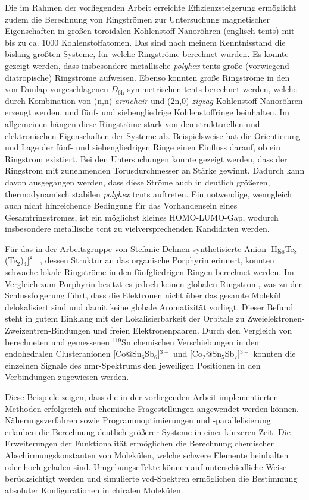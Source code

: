 \bigskip
Die im Rahmen der vorliegenden Arbeit erreichte Effizienzsteigerung ermöglicht zudem die Berechnung von Ringströmen zur Untersuchung magnetischer Eigenschaften in großen toroidalen Kohlenstoff-Nanoröhren (englisch \acfp{tcnt}) mit bis zu ca. 1000 Kohlenstoffatomen. Das sind nach meinem Kenntnisstand die bislang größten Systeme, für welche Ringströme berechnet wurden. Es konnte gezeigt werden, dass insbesondere metallische \textit{polyhex} \acp{tcnt} große (vorwiegend diatropische) Ringströme aufweisen. Ebenso konnten große Ringströme in den von Dunlap vorgeschlagenen $D_{\text{6h}}$-symmetrischen \acp{tcnt} berechnet werden, welche durch Kombination von (n,n) \textit{armchair} und (2n,0) \textit{zigzag} Kohlenstoff-Nanoröhren erzeugt werden, und fünf- und siebengliedrige Kohlenstoffringe beinhalten. Im allgemeinen hängen diese Ringströme stark von den strukturellen und elektronischen Eigenschaften der Systeme ab. Beispielsweise hat die Orientierung und Lage der fünf- und siebengliedrigen Ringe einen Einfluss darauf, ob ein Ringstrom existiert. Bei den Untersuchungen konnte gezeigt werden, dass der Ringstrom mit zunehmenden Torusdurchmesser an Stärke gewinnt. Dadurch kann davon ausgegangen werden, dass diese Ströme auch in deutlich größeren, thermodynamisch stabilen \textit{polyhex} \acp{tcnt} auftreten. Ein notwendige, wenngleich auch nicht hinreichende Bedingung für das Vorhandensein eines Gesamtringstromes, ist ein möglichst kleines HOMO-LUMO-Gap, wodurch insbesondere metallische \ac{tcnt} zu vielversprechenden Kandidaten werden.

Für das in der Arbeitsgruppe von Stefanie Dehnen synthetisierte Anion [Hg$_8$Te$_8$(Te$_2$)$_4$]$^{8-}$, dessen Struktur an das organische Porphyrin erinnert, konnten schwache lokale Ringströme in den fünfgliedrigen Ringen berechnet werden. Im Vergleich zum Porphyrin besitzt es jedoch keinen globalen Ringstrom, was zu der Schlussfolgerung führt, dass die Elektronen nicht über das gesamte Molekül delokalisiert sind und damit keine globale Aromatizität vorliegt. Dieser Befund steht in gutem Einklang mit der Lokalisierbarkeit der Orbitale zu Zweielektronen-Zweizentren-Bindungen und freien Elektronenpaaren.
Durch den Vergleich von berechneten und gemessenen $^{119}$Sn chemischen Verschiebungen in den endohedralen Clusteranionen [Co@Sn$_6$Sb$_6$]$^{3-}$ und [Co$_2$@Sn$_5$Sb$_7$]$^{3-}$ konnten die einzelnen Signale des \ac{nmr}-Spektrums den jeweiligen Positionen in den Verbindungen zugewiesen werden.

\bigskip
Diese Beispiele zeigen, dass die in der vorliegenden Arbeit implementierten Methoden erfolgreich auf chemische Fragestellungen angewendet werden können. Näherungsverfahren sowie Programmoptimierungen und -parallelisierung erlauben die Berechnung deutlich größerer Systeme in einer kürzeren Zeit. Die Erweiterungen der Funktionalität ermöglichen die Berechnung chemischer Abschirmungskonstanten von Molekülen, welche schwere Elemente beinhalten oder hoch geladen sind. Umgebungseffekte können auf unterschiedliche Weise berücksichtigt werden und simulierte \ac{vcd}-Spektren ermöglichen die Bestimmung absoluter Konfigurationen in chiralen Molekülen.

